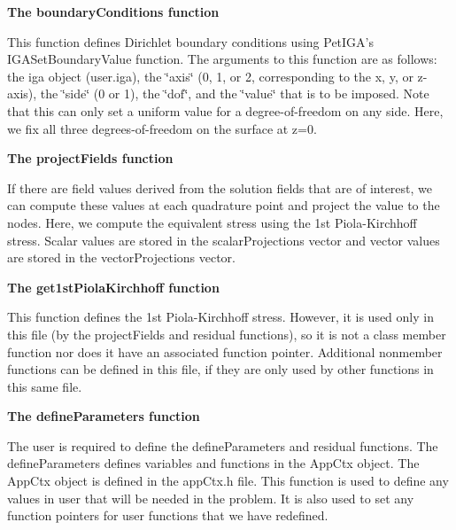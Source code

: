 {\bfseries  The {\ttfamily boundary\-Conditions} function }

This function defines Dirichlet boundary conditions using Pet\-I\-G\-A's {\ttfamily I\-G\-A\-Set\-Boundary\-Value} function. The arguments to this function are as follows\-: the iga object (user.\-iga), the \char`\"{}axis\char`\"{} (0, 1, or 2, corresponding to the x, y, or z-\/axis), the \char`\"{}side\char`\"{} (0 or 1), the \char`\"{}dof\char`\"{}, and the \char`\"{}value\char`\"{} that is to be imposed. Note that this can only set a uniform value for a degree-\/of-\/freedom on any side. Here, we fix all three degrees-\/of-\/freedom on the surface at z=0.


\begin{DoxyCodeInclude}

\end{DoxyCodeInclude}


{\bfseries  The {\ttfamily project\-Fields} function }

If there are field values derived from the solution fields that are of interest, we can compute these values at each quadrature point and project the value to the nodes. Here, we compute the equivalent stress using the 1st Piola-\/\-Kirchhoff stress. Scalar values are stored in the {\ttfamily scalar\-Projections} vector and vector values are stored in the {\ttfamily vector\-Projections} vector.


\begin{DoxyCodeInclude}

\end{DoxyCodeInclude}


{\bfseries  The {\ttfamily get1st\-Piola\-Kirchhoff} function }

This function defines the 1st Piola-\/\-Kirchhoff stress. However, it is used only in this file (by the {\ttfamily project\-Fields} and {\ttfamily residual} functions), so it is not a class member function nor does it have an associated function pointer. Additional nonmember functions can be defined in this file, if they are only used by other functions in this same file.


\begin{DoxyCodeInclude}

\end{DoxyCodeInclude}


{\bfseries  The {\ttfamily define\-Parameters} function }

The user is required to define the {\ttfamily define\-Parameters} and {\ttfamily residual} functions. The {\ttfamily define\-Parameters} defines variables and functions in the {\ttfamily App\-Ctx} object. The {\ttfamily App\-Ctx} object is defined in the app\-Ctx.\-h file. This function is used to define any values in {\ttfamily user} that will be needed in the problem. It is also used to set any function pointers for user functions that we have redefined.


